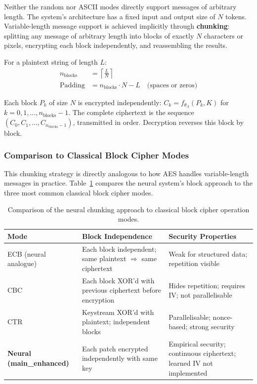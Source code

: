 \documentclass[12pt, a4paper]{article}
\newcommand{\thetaA}{\theta_{\!A}}
\begin{document}
Neither the random nor ASCII modes directly support messages
of arbitrary length. The system's architecture has a fixed input and
output size of $N$ tokens. Variable-length message support is achieved
implicitly through \textbf{chunking}: splitting any message of
arbitrary length into blocks of exactly $N$ characters or pixels,
encrypting each block independently, and reassembling the results.

For a plaintext string of length $L$:
%
\begin{align}
  n_{\mathrm{blocks}} &= \left\lceil \frac{L}{N} \right\rceil
  \label{eq:nblocks} \\[4pt]
  \text{Padding} &= n_{\mathrm{blocks}} \cdot N - L
  \quad \text{(spaces or zeros)}
  \label{eq:padding}
\end{align}

\noindent Each block $P_k$ of size $N$ is encrypted independently:
$C_k = f_{\thetaA}(P_k, K)$ for $k = 0, 1, \ldots, n_{\mathrm{blocks}}-1$.
The complete ciphertext is the sequence $(C_0, C_1, \ldots,
C_{n_{\mathrm{blocks}}-1})$, transmitted in order. Decryption
reverses this block by block.

\subsubsection*{Comparison to Classical Block Cipher Modes}

This chunking strategy is directly analogous to how AES handles
variable-length messages in practice. Table~\ref{tab:cipher_modes}
compares the neural system's block approach to the three most common
classical block cipher modes.

\begin{table}[H]
  \centering
  \caption{Comparison of the neural chunking approach to classical
           block cipher operation modes.}
  \label{tab:cipher_modes}
  \renewcommand{\arraystretch}{1.4}
  \begin{tabularx}{\linewidth}{@{} l X X @{}}
    \toprule
    \textbf{Mode} & \textbf{Block Independence} & \textbf{Security Properties} \\
    \midrule
    ECB (neural analogue) &
      Each block independent; same plaintext $\Rightarrow$ same ciphertext &
      Weak for structured data; repetition visible \\[4pt]
    CBC &
      Each block XOR'd with previous ciphertext before encryption &
      Hides repetition; requires IV; not parallelisable \\[4pt]
    CTR &
      Keystream XOR'd with plaintext; independent blocks &
      Parallelisable; nonce-based; strong security \\[4pt]
    \textbf{Neural (main\_enhanced)} &
      Each patch encrypted independently with same key &
      Empirical security; continuous ciphertext; learned IV not implemented \\
    \bottomrule
  \end{tabularx}
\end{table}
\end{document}
